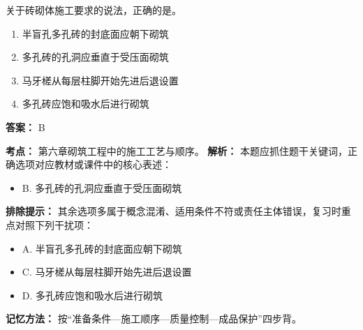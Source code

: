 \documentclass[UTF8,fontset=fandol,11pt]{ctexart}
\begin{document}
\begin{quizbox}[title={第 24 题}]
关于砖砌体施工要求的说法，正确的是。\\
\begin{enumerate}[label=\Alph*.]
\item 半盲孔多孔砖的封底面应朝下砌筑
\item 多孔砖的孔洞应垂直于受压面砌筑
\item 马牙槎从每层柱脚开始先进后退设置
\item 多孔砖应饱和吸水后进行砌筑
\end{enumerate}
\textbf{答案：} B
\vspace{0.25em}
\begin{answerbox}[title={考点解析}]
\textbf{考点：} 第六章砌筑工程中的施工工艺与顺序。
\textbf{解析：} 本题应抓住题干关键词，正确选项对应教材或课件中的核心表述：
\begin{itemize}
\item B. 多孔砖的孔洞应垂直于受压面砌筑
\end{itemize}
\textbf{排除提示：} 其余选项多属于概念混淆、适用条件不符或责任主体错误，复习时重点对照下列干扰项：
\begin{itemize}
\item A. 半盲孔多孔砖的封底面应朝下砌筑
\item C. 马牙槎从每层柱脚开始先进后退设置
\item D. 多孔砖应饱和吸水后进行砌筑
\end{itemize}
\textbf{记忆方法：} 按“准备条件—施工顺序—质量控制—成品保护”四步背。
\end{answerbox}
\end{quizbox}

\vspace{0.2em}
\end{document}
